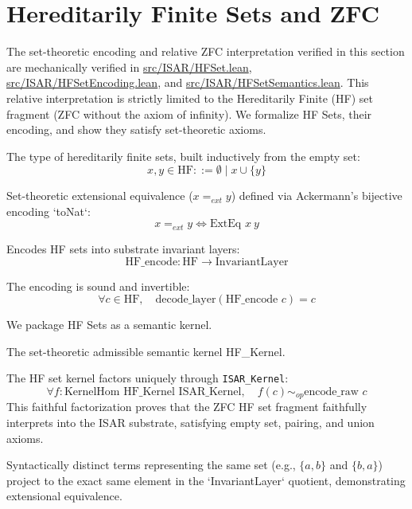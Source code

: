 \section{Hereditarily Finite Sets and ZFC}

The set-theoretic encoding and relative ZFC interpretation verified in this section are mechanically verified in \url{src/ISAR/HFSet.lean}, \url{src/ISAR/HFSetEncoding.lean}, and \url{src/ISAR/HFSetSemantics.lean}. This relative interpretation is strictly limited to the Hereditarily Finite (HF) set fragment (ZFC without the axiom of infinity). We formalize HF Sets, their encoding, and show they satisfy set-theoretic axioms.

\begin{definition}[HF Sets]
The type of hereditarily finite sets, built inductively from the empty set:
$$x, y \in \text{HF} ::= \emptyset \mid x \cup \{y\}$$
\end{definition}

\begin{definition}
Set-theoretic extensional equivalence ($x =_{ext} y$) defined via Ackermann's bijective encoding `toNat`:
$$x =_{ext} y \iff \text{ExtEq } x\ y$$
\end{definition}

\begin{definition}
Encodes HF sets into substrate invariant layers:
$$\text{HF\_encode} : \text{HF} \to \text{InvariantLayer}$$
\end{definition}

\begin{theorem}
The encoding is sound and invertible:
$$\forall c \in \text{HF}, \quad \text{decode\_layer}(\text{HF\_encode } c) = c$$
\end{theorem}

We package HF Sets as a semantic kernel.

\begin{definition}
The set-theoretic admissible semantic kernel HF\_Kernel.
\end{definition}

\begin{theorem}
The HF set kernel factors uniquely through \texttt{ISAR\_Kernel}:
$$\forall f : \text{KernelHom HF\_Kernel ISAR\_Kernel}, \quad f(c) \sim_{op} \text{encode\_raw } c$$
This faithful factorization proves that the ZFC HF set fragment faithfully interprets into the ISAR substrate, satisfying empty set, pairing, and union axioms.

Syntactically distinct terms representing the same set (e.g., $\{a, b\}$ and $\{b, a\}$) project to the exact same element in the `InvariantLayer` quotient, demonstrating extensional equivalence.
\end{theorem}

